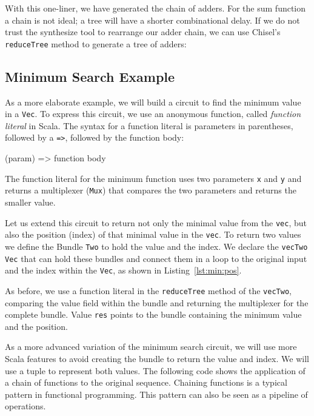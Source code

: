 \documentclass[%
    10pt,
    headinclude, footexclude,
    openright, %
    notitlepage,
    cleardoubleempty,
    headsepline,
    pointlessnumbers,
    bibtotoc, idxtotoc,
    ]{scrbook}
\newcommand{\code}[1]{{\lstinline[basicstyle=\small\ttfamily]{#1}}}
\begin{document}

\noindent With this one-liner, we have generated the chain of adders. For the sum function
a chain is not ideal; a tree will have a shorter combinational delay.
If we do not trust the synthesize tool to rearrange our adder chain, we can use Chisel's
\code{reduceTree} method to generate a tree of adders:


\subsection{Minimum Search Example}

As a more elaborate example, we will build a circuit to find the minimum value in a \code{Vec}. To express this circuit,
we use an anonymous function, called \emph{function literal} in Scala.  The syntax for a function
literal is parameters in parentheses, followed by a \code{=>}, followed by the function body:

\begin{chisel}
  (param) => function body
\end{chisel}

The function literal for the minimum function uses two parameters \code{x} and \code{y}
and returns a multiplexer (\code{Mux}) that compares the two parameters and returns the smaller
value.


Let us extend this circuit to return not only the minimal value from the \code{vec}, but also the
position (index) of that minimal value in the \code{vec}. To return two values we define the Bundle \code{Two} to
hold the value and the index. We declare the \code{vecTwo} \code{Vec} that can hold these bundles
and connect them in a loop to the original input and the index within the \code{Vec}, as shown
in Listing~\ref{lst:min:pos}.

As before, we use a function literal in the \code{reduceTree} method of the \code{vecTwo},
comparing the value field within the bundle and returning the multiplexer for the
complete bundle.
Value \code{res} points to the bundle containing the minimum value and the position.



As a more advanced variation of the minimum search circuit, we will use more Scala features
to avoid creating the bundle to return the value
and index. We will use a tuple to represent both values.
The following code shows the application
of a chain of functions to the original sequence. Chaining functions is a typical pattern in functional programming.
This pattern can also be seen as a pipeline of operations.
\end{document}
